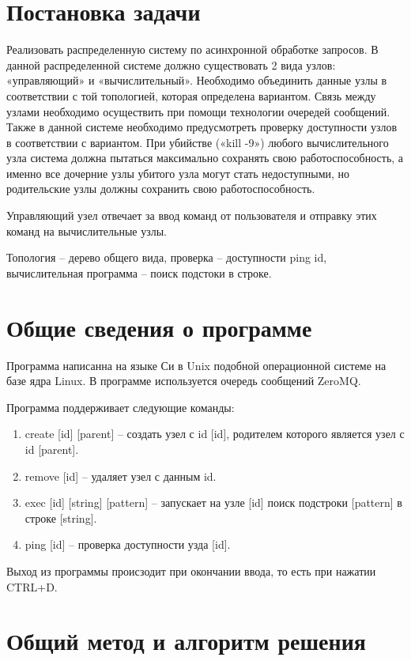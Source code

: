 \documentclass[pdf, unicode, 12pt, a4paper,oneside,fleqn]{article}
\begin{document}
\section{Постановка задачи}

Реализовать распределенную систему по асинхронной обработке запросов. 
В данной распределенной системе должно существовать 2 вида узлов: 
«управляющий» и «вычислительный». Необходимо объединить данные узлы в 
соответствии с той топологией, которая определена вариантом. Связь между
узлами необходимо осуществить при помощи технологии очередей сообщений.
Также в данной системе необходимо предусмотреть проверку доступности
узлов в соответствии с вариантом. При убийстве («kill -9») любого
вычислительного узла система должна пытаться максимально сохранять
свою работоспособность, а именно все дочерние узлы убитого узла могут стать
недоступными, но родительские узлы должны сохранить свою работоспособность.

Управляющий узел отвечает за ввод команд от пользователя и отправку этих команд
на вычислительные узлы.

Топология \--- дерево общего вида, проверка \--- доступности ping id, вычислительная
программа \--- поиск подстоки в строке.

\section{Общие сведения о программе}
Программа написанна на языке Си в Unix подобной операционной системе на базе ядра Linux.
В программе используется очередь сообщений ZeroMQ.

Программа поддерживает следующие команды:
\begin{enumerate}
    \item create [id] [parent] \--- создать узел с id [id], родителем которого является узел с id [parent].
    \item remove [id] \--- удаляет узел с данным id.
    \item exec [id] [string] [pattern] \--- запускает на узле [id] поиск подстроки [pattern] в строке [string].
    \item ping [id] \--- проверка доступности узда [id].
\end{enumerate}

Выход из программы происзодит при окончании ввода, то есть при нажатии CTRL+D.

\section{Общий метод и алгоритм решения}
\end{document}
